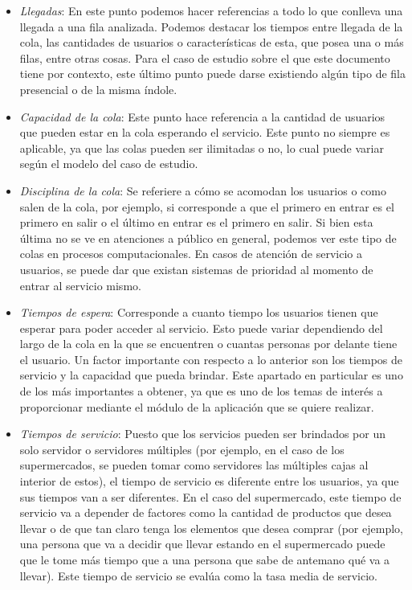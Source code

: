 \begin{itemize}
    \item \textit{Llegadas}:
    \newline
    En este punto podemos hacer referencias a todo lo que conlleva una llegada a una fila analizada. Podemos destacar los tiempos entre llegada de la cola, las cantidades de usuarios o características de esta, que posea una o más filas, entre otras cosas. Para el caso de estudio sobre el que este documento tiene por contexto, este último punto puede darse existiendo algún tipo de fila presencial o de la misma \'indole.
    
    \item \textit{Capacidad de la cola}:
    \newline
    Este punto hace referencia a la cantidad de usuarios que pueden estar en la cola esperando el servicio. Este punto no siempre es aplicable, ya que las colas pueden ser ilimitadas o no, lo cual puede variar según el modelo del caso de estudio.
    
    \item \textit{Disciplina de la cola}:
    \newline
    Se referiere a cómo se acomodan los usuarios o como salen de la cola, por ejemplo, si corresponde a que el primero en entrar es el primero en salir o el último en entrar es el primero en salir. Si bien esta última no se ve en atenciones a público en general, podemos ver este tipo de colas en procesos computacionales. En casos de atención de servicio a usuarios, se puede dar que existan sistemas de prioridad al momento de entrar al servicio mismo.
    
    \item \textit{Tiempos de espera}:
    \newline
    Corresponde a cuanto tiempo los usuarios tienen que esperar para poder acceder al servicio. Esto puede variar dependiendo del largo de la cola en la que se encuentren o cuantas personas por delante tiene el usuario. Un factor importante con respecto a lo anterior son los tiempos de servicio y la capacidad que pueda brindar. Este apartado en particular es uno de los más importantes a obtener, ya que es uno de los temas de interés a proporcionar mediante el módulo de la aplicación que se quiere realizar.
    
    \item \textit{Tiempos de servicio}:
    \newline
    Puesto que los servicios pueden ser brindados por un solo servidor o servidores múltiples (por ejemplo, en el caso de los supermercados, se pueden tomar como servidores las múltiples cajas al interior de estos), el tiempo de servicio es diferente entre los usuarios, ya que sus tiempos van a ser diferentes. En el caso del supermercado, este tiempo de servicio va a depender de factores como la cantidad de productos que desea llevar o de que tan claro tenga los elementos que desea comprar (por ejemplo, una persona que va a decidir que llevar estando en el supermercado puede que le tome más tiempo que a una persona que sabe de antemano qué va a llevar). Este tiempo de servicio se evalúa como la tasa media de servicio.
    

\end{itemize}
